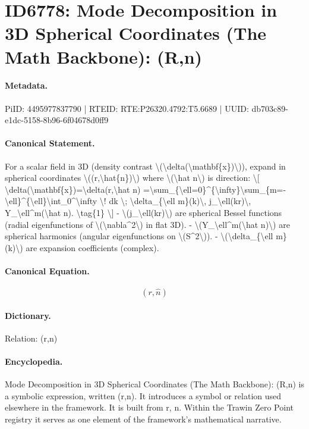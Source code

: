 \section*{ID6778: Mode Decomposition in 3D Spherical Coordinates (The Math Backbone): (R,n)}
\paragraph{Metadata.}
PiID: 4495977837790 | RTEID: RTE:P26320.4792:T5.6689 | UUID: db703c89-e1dc-5158-8b96-6f04678d0ff9

\paragraph{Canonical Statement.}
For a scalar field in 3D (density contrast \textbackslash{}(\textbackslash{}delta(\textbackslash{}mathbf\{x\})\textbackslash{})), expand in spherical coordinates \textbackslash{}((r,\textbackslash{}hat\{n\})\textbackslash{}) where \textbackslash{}(\textbackslash{}hat n\textbackslash{}) is direction: \textbackslash{}[ \textbackslash{}delta(\textbackslash{}mathbf\{x\})=\textbackslash{}delta(r,\textbackslash{}hat n) =\textbackslash{}sum\_\{\textbackslash{}ell=0\}\textasciicircum{}\{\textbackslash{}infty\}\textbackslash{}sum\_\{m=-\textbackslash{}ell\}\textasciicircum{}\{\textbackslash{}ell\}\textbackslash{}int\_0\textasciicircum{}\textbackslash{}infty \textbackslash{}! dk \textbackslash{}; \textbackslash{}delta\_\{\textbackslash{}ell m\}(k)\textbackslash{}, j\_\textbackslash{}ell(kr)\textbackslash{}, Y\_\textbackslash{}ell\textasciicircum{}m(\textbackslash{}hat n). \textbackslash{}tag\{1\} \textbackslash{}] - \textbackslash{}(j\_\textbackslash{}ell(kr)\textbackslash{}) are spherical Bessel functions (radial eigenfunctions of \textbackslash{}(\textbackslash{}nabla\textasciicircum{}2\textbackslash{}) in flat 3D). - \textbackslash{}(Y\_\textbackslash{}ell\textasciicircum{}m(\textbackslash{}hat n)\textbackslash{}) are spherical harmonics (angular eigenfunctions on \textbackslash{}(S\textasciicircum{}2\textbackslash{})). - \textbackslash{}(\textbackslash{}delta\_\{\textbackslash{}ell m\}(k)\textbackslash{}) are expansion coefficients (complex).

\paragraph{Canonical Equation.}
\[
(r,\hat{n})
\]

\paragraph{Dictionary.}
Relation: (r,n)

\paragraph{Encyclopedia.}
Mode Decomposition in 3D Spherical Coordinates (The Math Backbone): (R,n) is a symbolic expression, written (r,n). It introduces a symbol or relation used elsewhere in the framework. It is built from r, n. Within the Trawin Zero Point registry it serves as one element of the framework's mathematical narrative.

